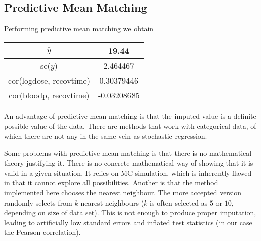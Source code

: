 \documentclass[11pt]{article}
\begin{document}
\subsection*{Predictive Mean Matching}

Performing predictive mean matching we obtain 

\begin{table}[H]
	\centering
	\begin{tabular}{|c|c|}
		\hline 
		$\bar{y}$ & 19.44\\ 
		\hline 
		se($y$) & 2.464467\\ 
		\hline 
		cor(logdose, recovtime) & 0.30379446\\ 
		\hline 
		cor(bloodp, recovtime) & -0.03208685\\ 
		\hline 
	\end{tabular} 
\end{table}

An advantage of predictive mean matching is that the imputed value is a definite possible value of the data. There are methods that work with categorical data, of which there are not any in the same vein as stochastic regression. 

Some problems with predictive mean matching is that there is no mathematical theory justifying it. There is no concrete mathematical way of showing that it is valid in a given situation. It relies on MC simulation, which is inherently flawed in that it cannot explore all possibilities. Another is that the method implemented here chooses the nearest neighbour. The more accepted version randomly selects from $k$ nearest neighbours ($k$ is often selected as $5$ or $10$, depending on size of data set). This is not enough to produce proper imputation, leading to artificially low standard errors and inflated test statistics (in our case the Pearson correlation). 
\end{document}
